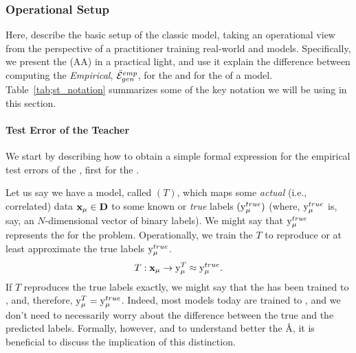 \subsubsection{Operational Setup}
\label{sxn:ST_OP_setup}



Here, describe the basic setup of the classic \StudentTeacher model, taking an operational view from the perspective of a practitioner training real-world \Student and \Teacher models.  Specifically, we present the \AnnealedApproximation (AA) in a practical light,
and use it explain the difference between computing the \emph{Empirical\GeneralizationError}, $\bar{\mathcal{E}}^{emp}_{gen}$, for the \emph{\TrueAccuracy}
and for the \emph{\Precision} of a \Teacher model. Table~\ref{tab;st_notation} summarizes some of the key notation we will be using in this section.


\paragraph{Test Error of the Teacher}

We start by describing how to obtain a simple formal expression for the empirical test errors of the \Teacher, first for the \TrueAccuracy.

Let us say we have a model, called \Teacher $(T)$, which maps some \emph{actual} (i.e., correlated) data
$\mathbf{x}_{\mu}\in\mathbf{D}$ to some known or \emph{true}  labels $(\mathrm{y}_{\mu}^{true})$
(where,  $\mathrm{y}_{\mu}^{true}$ is, say, an $N$-dimensional vector of binary labels).
We might say that $\mathrm{y}_{\mu}^{true}$ represents the \emph{\GroundTruth} for the problem.
Operationally, we train the \Teacher $T$ to reproduce or at least approximate the true labels $\mathrm{y}_{\mu}^{true}$.
\begin{align}
 T:\mathbf{x}_{\mu}\rightarrow \mathrm{y}_{\mu}^{T} \approx \mathrm{y}_{\mu}^{true}.
\end{align}
If $T$ reproduces the true labels exactly, we might say that the \Teacher has been
trained to \emph{\Interpolation}, and, therefore, $\mathrm{y}_{\mu}^{T} = \mathrm{y}_{\mu}^{true}$.
Indeed, most models today are trained to \emph{\Interpolation}, and we don't need to
necessarily worry about the difference between the true and the predicted \Teacher labels.
Formally, however, and to understand better the \AA, it is beneficial to discuss the implication
of this distinction.

